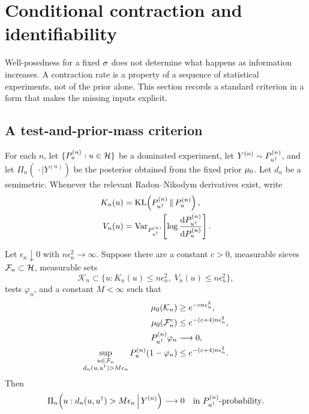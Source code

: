 \section{Conditional contraction and identifiability}
\label{sec:contraction}

Well-posedness for a fixed $\sigma$ does not determine what happens
as information increases.  A contraction rate is a property of a
sequence of statistical experiments, not of the prior alone.  This
section records a standard criterion in a form that makes the missing
inputs explicit.

\subsection{A test-and-prior-mass criterion}

For each $n$, let
$\{P_u^{(n)}:u\in\mathcal{H}\}$ be a dominated experiment, let
$Y^{(n)}\sim P_{{u^{\dagger}}}^{(n)}$, and let $\Pi_n(\,\cdot\mid Y^{(n)})$
be the posterior obtained from the fixed prior ${\mu_{0}}$.  Let $d_n$ be
a semimetric.  Whenever the relevant Radon--Nikodym derivatives exist,
write
\begin{align}
  K_n(u)
    &=\operatorname{KL}\!\left(P_{{u^{\dagger}}}^{(n)}\,\|\,P_u^{(n)}\right),\\
  V_n(u)
    &=\operatorname{Var}_{P_{{u^{\dagger}}}^{(n)}}\!
      \left[
        \log\frac{\mathrm dP_{{u^{\dagger}}}^{(n)}}{\mathrm dP_u^{(n)}}
      \right].
\end{align}

\begin{theorem}
\label{thm:contraction}
Let $\epsilon_n\downarrow0$ with $n\epsilon_n^2\to\infty$.  Suppose
there are a constant $c>0$, measurable sieves
$\mathcal F_n\subset\mathcal{H}$, measurable sets
\begin{equation}
  \mathcal K_n
  \subset
  \{u:K_n(u)\leq n\epsilon_n^2,\;
       V_n(u)\leq n\epsilon_n^2\},
  \label{eq:kl-neighborhood}
\end{equation}
tests $\varphi_n$, and a constant $M<\infty$ such that
\begin{align}
  {\mu_{0}}(\mathcal K_n)
    &\geq e^{-c n\epsilon_n^2}, \label{eq:contraction-mass}\\
  {\mu_{0}}(\mathcal F_n^c)
    &\leq e^{-(c+4)n\epsilon_n^2}, \label{eq:contraction-sieve}\\
  P_{{u^{\dagger}}}^{(n)}\varphi_n
    &\longrightarrow0, \label{eq:contraction-type1}\\
  \sup_{\substack{u\in\mathcal F_n\\
                   d_n(u,{u^{\dagger}})>M\epsilon_n}}
  P_u^{(n)}(1-\varphi_n)
    &\leq e^{-(c+4)n\epsilon_n^2}. \label{eq:contraction-type2}
\end{align}
Then
\begin{equation}
  \Pi_n\!\left(
    u:d_n(u,{u^{\dagger}})>M\epsilon_n
    \,\middle|\,Y^{(n)}
  \right)
  \longrightarrow0
  \quad\text{in }P_{{u^{\dagger}}}^{(n)}\text{-probability}.
  \label{eq:contraction-conclusion}
\end{equation}
\end{theorem}

